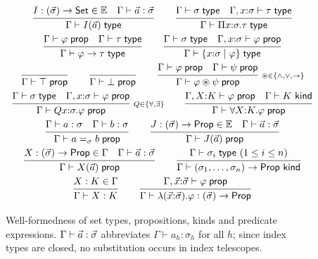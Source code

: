 \begin{figure}[tp]
\small
\[
\begin{array}{c}
\rul{I : (\tup{\sigma}) \to \Set \in \Env \quad
     \Gamma \vdash \tup{a} : \tup{\sigma}}
    {\Gamma \vdash I(\tup{a}) \styp}
\qquad
\rul{\Gamma \vdash \sigma \styp \quad \Gamma, x{:}\sigma \vdash \tau \styp}
    {\Gamma \vdash \Pi x{:}\sigma.\tau \styp}
\\[2.2ex]
\rul{\Gamma \vdash \varphi \sprop \quad \Gamma \vdash \tau \styp}
    {\Gamma \vdash \varphi \to \tau \styp}
\qquad
\rul{\Gamma \vdash \sigma \styp \quad \Gamma, x{:}\sigma \vdash \varphi \sprop}
    {\Gamma \vdash \refty{x{:}\sigma}{\varphi} \styp}
\\[2.2ex]
\rul{}{\Gamma \vdash \top \sprop}
\qquad
\rul{}{\Gamma \vdash \bot \sprop}
\qquad
\rul{\Gamma \vdash \varphi \sprop \quad \Gamma \vdash \psi \sprop}
    {\Gamma \vdash \varphi \mathbin{\circledast} \psi \sprop}
\;{\scriptstyle \circledast \in \{\wedge,\vee,\to\}}
\\[2.2ex]
\rul{\Gamma \vdash \sigma \styp \quad \Gamma, x{:}\sigma \vdash \varphi \sprop}
    {\Gamma \vdash Qx{:}\sigma.\varphi \sprop}
\;{\scriptstyle Q \in \{\forall,\exists\}}
\qquad
\rul{\Gamma, X{:}K \vdash \varphi \sprop \quad \Gamma \vdash K\ \mathsf{kind}}
    {\Gamma \vdash \forall X{:}K.\varphi \sprop}
\\[2.2ex]
\rul{\Gamma \vdash a : \sigma \quad \Gamma \vdash b : \sigma}
    {\Gamma \vdash a =_{\sigma} b \sprop}
\qquad
\rul{J : (\tup{\sigma}) \to \Prop \in \Env \quad \Gamma \vdash \tup{a} : \tup{\sigma}}
    {\Gamma \vdash J(\tup{a}) \sprop}
\\[2.2ex]
\rul{X : (\tup{\sigma}) \to \Prop \in \Gamma \quad \Gamma \vdash \tup{a} : \tup{\sigma}}
    {\Gamma \vdash X(\tup{a}) \sprop}
\qquad
\rul{\Gamma \vdash \sigma_i \styp \ (1 \le i \le n)}
    {\Gamma \vdash (\sigma_1,\dots,\sigma_n) \to \Prop\ \mathsf{kind}}
\\[2.2ex]
\rul{X : K \in \Gamma}{\Gamma \vdash X : K}
\qquad
\rul{\Gamma, \tup{x}{:}\tup{\sigma} \vdash \varphi \sprop}
    {\Gamma \vdash \lambda(\tup{x}{:}\tup{\sigma}).\varphi : (\tup{\sigma}) \to \Prop}
\end{array}
\]
\caption{Well-formedness of set types, propositions, kinds and predicate
  expressions.  $\Gamma \vdash \vec{a} : \vec{\sigma}$ abbreviates
  $\Gamma \vdash a_h : \sigma_h$ for all $h$; since index types are
  closed, no substitution occurs in index telescopes.}
\label{fig:wf}
\end{figure}

